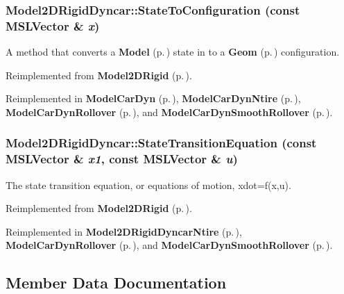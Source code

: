 \subsubsection{ Model2DRigid\-Dyncar::State\-To\-Configuration (const {\bf MSLVector} \& {\em x})\hspace{0.3cm}{\tt  [virtual]}}\label{classModel2DRigidDyncar_a3}


A method that converts a {\bf Model} {\rm (p.\,\pageref{classModel})} state in to a {\bf Geom} {\rm (p.\,\pageref{classGeom})} configuration.



Reimplemented from {\bf Model2DRigid} {\rm (p.\,\pageref{classModel2DRigid_a6})}.

Reimplemented in {\bf Model\-Car\-Dyn} {\rm (p.\,\pageref{classModelCarDyn_a2})}, {\bf Model\-Car\-Dyn\-Ntire} {\rm (p.\,\pageref{classModelCarDynNtire_a2})}, {\bf Model\-Car\-Dyn\-Rollover} {\rm (p.\,\pageref{classModelCarDynRollover_a4})}, and {\bf Model\-Car\-Dyn\-Smooth\-Rollover} {\rm (p.\,\pageref{classModelCarDynSmoothRollover_a3})}.
\subsubsection{ Model2DRigid\-Dyncar::State\-Transition\-Equation (const {\bf MSLVector} \& {\em x1}, const {\bf MSLVector} \& {\em u})\hspace{0.3cm}{\tt  [virtual]}}\label{classModel2DRigidDyncar_a4}


The state transition equation, or equations of motion, xdot=f(x,u).



Reimplemented from {\bf Model2DRigid} {\rm (p.\,\pageref{classModel2DRigid_a3})}.

Reimplemented in {\bf Model2DRigid\-Dyncar\-Ntire} {\rm (p.\,\pageref{classModel2DRigidDyncarNtire_a2})}, {\bf Model\-Car\-Dyn\-Rollover} {\rm (p.\,\pageref{classModelCarDynRollover_a3})}, and {\bf Model\-Car\-Dyn\-Smooth\-Rollover} {\rm (p.\,\pageref{classModelCarDynSmoothRollover_a2})}.

\subsection{Member Data Documentation}
